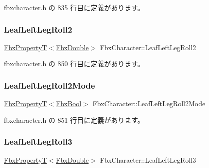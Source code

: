  fbxcharacter.\+h の 835 行目に定義があります。

\mbox{\label{class_fbx_character_a96827678c049046c127540cb02c4107d}} 
\subsubsection{\texorpdfstring{Leaf\+Left\+Leg\+Roll2}{LeafLeftLegRoll2}}
{\footnotesize\ttfamily \hyperlink{class_fbx_property_t}{Fbx\+PropertyT}$<$\hyperlink{fbxtypes_8h_a171e72a1c46fc15c1a6c9c31948c1c5b}{Fbx\+Double}$>$ Fbx\+Character\+::\+Leaf\+Left\+Leg\+Roll2}



 fbxcharacter.\+h の 850 行目に定義があります。

\mbox{\label{class_fbx_character_a0f212d39e322d52f7f9c24982d156e68}} 
\subsubsection{\texorpdfstring{Leaf\+Left\+Leg\+Roll2\+Mode}{LeafLeftLegRoll2Mode}}
{\footnotesize\ttfamily \hyperlink{class_fbx_property_t}{Fbx\+PropertyT}$<$\hyperlink{fbxtypes_8h_a92e0562b2fe33e76a242f498b362262e}{Fbx\+Bool}$>$ Fbx\+Character\+::\+Leaf\+Left\+Leg\+Roll2\+Mode}



 fbxcharacter.\+h の 851 行目に定義があります。

\mbox{\label{class_fbx_character_ab83b35313550caf1d688b0cca866833d}} 
\subsubsection{\texorpdfstring{Leaf\+Left\+Leg\+Roll3}{LeafLeftLegRoll3}}
{\footnotesize\ttfamily \hyperlink{class_fbx_property_t}{Fbx\+PropertyT}$<$\hyperlink{fbxtypes_8h_a171e72a1c46fc15c1a6c9c31948c1c5b}{Fbx\+Double}$>$ Fbx\+Character\+::\+Leaf\+Left\+Leg\+Roll3}



